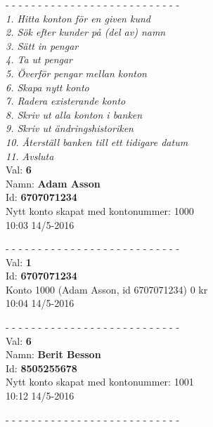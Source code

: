 \newenvironment{exampleblock}
	{\begin{minipage}{\columnwidth}
	 - - - - - - - - - - - - - - - - - - - - - - - - - - -\\}
	{\end{minipage}}

\begin{multicols}{2}
\noindent
\begin{exampleblock}
\textit{
1.   Hitta konton för en given kund\\
2.   Sök efter kunder på (del av) namn\\
3.   Sätt in pengar\\
4.   Ta ut pengar\\
5.   Överför pengar mellan konton\\
6.   Skapa nytt konto\\
7.   Radera existerande konto\\
8.   Skriv ut alla konton i banken\\
9.   Skriv ut ändringshistoriken\\
10.  Återställ banken till ett tidigare datum\\
11.  Avsluta\\
}
Val: \textbf{6}\\
Namn: \textbf{Adam Asson}\\
Id: \textbf{6707071234}\\
Nytt konto skapat med kontonummer: 1000\\
10:03 14/5-2016\\
\end{exampleblock}
\begin{exampleblock}
Val: \textbf{1}\\
Id: \textbf{6707071234}\\
Konto 1000 (Adam Asson, id 6707071234) 0 kr\\
10:04 14/5-2016\\
\end{exampleblock}
\begin{exampleblock}
Val: \textbf{6}\\
Namn: \textbf{Berit Besson}\\
Id: \textbf{8505255678}\\
Nytt konto skapat med kontonummer: 1001\\
10:12 14/5-2016\\
\end{exampleblock}
\begin{exampleblock}

\end{exampleblock}
\end{multicols}
